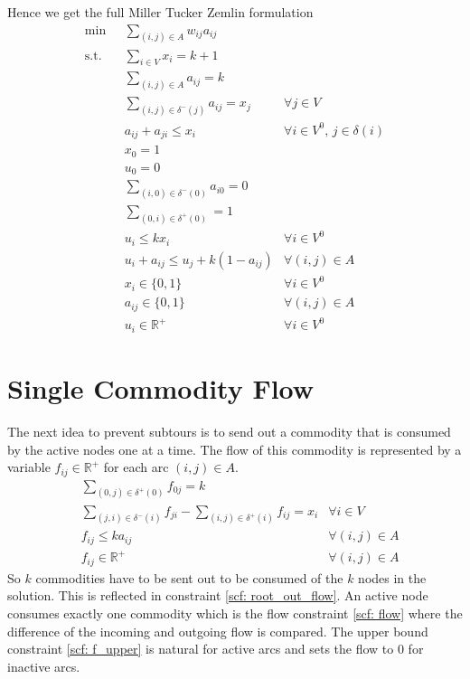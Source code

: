 \documentclass{article}
\newcommand{\R}{\mathbb{R}}
\begin{document}
	Hence we get the full Miller Tucker Zemlin formulation	
	\begin{align*}
		\min & \sum_{(i,j) \in A} w_{ij} a_{ij} 	\\
		\text{s.t.} \quad & \sum_{i \in V} x_i = k+1  \\
		& \sum_{(i,j) \in A} a_{ij} = k \\ 
		& \sum_{(i,j) \in \delta^-(j)} a_{ij} = x_j & \forall j \in V  \\	
		& a_{ij} + a_{ji} \leq x_i & \forall i \in V^0, \, j \in \delta(i)  \\
		& x_0 = 1 \\
		& u_0 = 0 \\
		& \sum_{(i,0) \in \delta^-(0)} a_{i0} = 0	\\
		& \sum_{(0,i) \in \delta^+(0)} = 1 \\
		& u_i \leq k x_i & \forall i \in V^0  \\
		& u_i + a_{ij} \leq u_j + k (1-a_{ij}) & \forall (i,j) \in A \\
		& x_i \in \lbrace 0,1 \rbrace & \forall i \in V^0  \\
		& a_{ij} \in \lbrace 0,1 \rbrace & \forall (i,j) \in A  \\
		& u_i \in \R^+ & \forall i \in V^0 
	\end{align*}	
	
	\newpage
	\section{Single Commodity Flow}
	The next idea to prevent subtours is to send out a commodity that is consumed by the active nodes one at a time. The flow of this commodity is represented by a variable $f_{ij} \in \R^+$ for each arc $(i,j) \in A$.
	\begin{align}		
		&\sum_{(0,j) \in \delta^+(0)} f_{0j} = k \label{scf: root_out_flow} \\
		&\sum_{(j,i) \in \delta^-(i)} f_{ji} - \sum_{(i,j) \in \delta^+(i)} f_{ij} = x_i & \forall i \in V\label{scf: flow} \\
		&f_{ij} \leq k a_{ij} & \forall (i,j) \in A \label{scf: f_upper} \\
		&f_{ij} \in \R^+ & \forall (i,j) \in A \label{scf: f}
	\end{align}	
	So $k$ commodities have to be sent out to be consumed of the $k$ nodes in the solution. This is reflected in constraint \eqref{scf: root_out_flow}. An active node consumes exactly one commodity which is the flow constraint \eqref{scf: flow} where the difference of the incoming and outgoing flow is compared. The upper bound constraint \eqref{scf: f_upper} is natural for active arcs and sets the flow to $0$ for inactive arcs.
\end{document}
